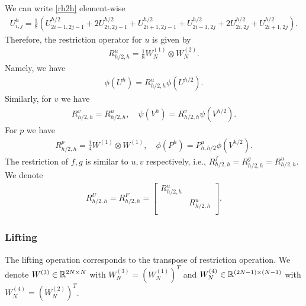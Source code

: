 \documentclass[english]{pkupaper}
\newenvironment{eqt}{\begin{equation}\begin{aligned}}{\end{aligned}\end{equation}}
\begin{document}
We can write \ref{rh2h} element-wise
\begin{eqt}
U^{h}_{i,j}=\frac{1}{8}(U^{h/2}_{2i-1,2j-1}+2U^{h/2}_{2i,2j-1}+U^{h/2}_{2i+1,2j-1}+U^{h/2}_{2i-1,2j}+2U^{h/2}_{2i,2j}+U^{h/2}_{2i+1,2j}).
\end{eqt}
Therefore, the restriction operator for $u$ is given by 
\begin{eqt}
R_{h/2,h}^u=\frac{1}{8}W_N^{(1)}\otimes W_N^{(2)}.
\end{eqt}
Namely, we have
\begin{eqt}
\phi(U^{h})=R_{h/2,h}^u\phi(U^{h/2}).
\end{eqt}
Similarly, for $v$ we have
\begin{eqt}
R_{h/2,h}^v=R_{h/2,h}^u, \quad \psi(V^{h})=R_{h/2,h}^v\psi(V^{h/2}).
\end{eqt}
For $p$ we have 
\begin{eqt}
R_{h/2,h}^p=\frac{1}{4}W^{(1)}\otimes W^{(1)}, \quad \phi(P^{h})=P_{h,h/2}^u\phi(V^{h/2}).
\end{eqt}
The restriction of $f,g$ is similar to $u,v$ respectively, i.e., $R_{h/2,h}^f=R_{h/2,h}^g=R_{h/2,h}^u$. We denote
\begin{eqt}
R_{h/2,h}^U=R_{h/2,h}^F=\begin{bmatrix}
R_{h/2,h}^u\\
&R_{h/2,h}^u\\
\end{bmatrix}.
\end{eqt}

\subsubsection{Lifting}
The lifting operation corresponds to the transpose of restriction operation. We denote $W^{(3)}\in \mathbb{R}^{2N\times N}$ with $W^{(3)}_N=\left(W^{(1)}_N\right)^T$ and $W^{(4)}_N \in \mathbb{R}^{(2N-1)\times(N-1)}$ with $W^{(4)}_N=\left(W^{(2)}_N\right)^T$.
\end{document}

